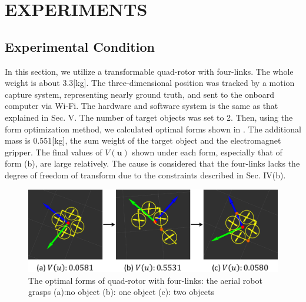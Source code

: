 \section{EXPERIMENTS}
\subsection{Experimental Condition}
In this section, we utilize a transformable quad-rotor with four-links. The whole weight is about 3.3[kg]. The three-dimensional position was tracked by a motion capture system, representing nearly ground truth, and sent to the onboard computer via Wi-Fi. The hardware and software system is the same as that explained in Sec. V. The number of target objects was set to 2. Then, using the form optimization method, we calculated optimal forms shown in . The additional mass is 0.551[kg], the sum weight of the target object and the electromagnet gripper. The final values of $V(\bm{u})$ shown under each form, especially that of form (b), are large relatively. The cause is considered that the four-links lacks the degree of freedom of transform due to the constraints described in Sec. IV(b). 
\begin{figure}[t]
  \begin{center}
    \includegraphics[width=1.0\columnwidth]{figs/quad_state.pdf}
  \end{center}
  \caption{The optimal forms of quad-rotor with four-links: the aerial robot grasps (a):no object (b): one object (c): two objects\label{figure:quad_state}}
\end{figure}

